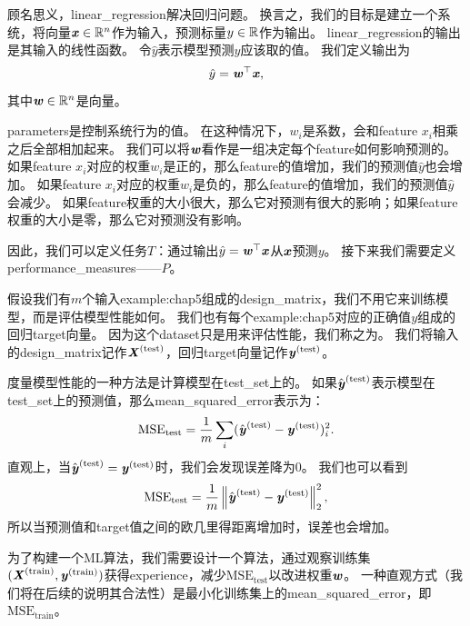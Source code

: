 顾名思义，\gls{linear_regression}解决回归问题。
换言之，我们的目标是建立一个系统，将向量$\boldsymbol{\mathit{x}}\in\mathbb{R}^n$作为输入，预测标量$y\in\mathbb{R}$作为输出。
\gls{linear_regression}的输出是其输入的线性函数。
令$\hat{y}$表示模型预测$y$应该取的值。
我们定义输出为
\begin{equation}
    \hat{y} = \boldsymbol{\mathit{w}}^\top \boldsymbol{\mathit{x}} ,
\end{equation}
其中$\boldsymbol{\mathit{w}}\in\mathbb{R}^n$是向量。

\gls{parameters}是控制系统行为的值。
在这种情况下，$w_i$是系数，会和\gls{feature} $x_i$相乘之后全部相加起来。
我们可以将$\boldsymbol{\mathit{w}}$看作是一组决定每个\gls{feature}如何影响预测的。
如果\gls{feature} $x_i$对应的权重$w_i$是正的，那么\gls{feature}的值增加，我们的预测值$\hat{y}$也会增加。
如果\gls{feature} $x_i$对应的权重$w_i$是负的，那么\gls{feature}的值增加，我们的预测值$\hat{y}$会减少。
如果\gls{feature}权重的大小很大，那么它对预测有很大的影响；如果\gls{feature}权重的大小是零，那么它对预测没有影响。


因此，我们可以定义任务$T$：通过输出$\hat{y} = \boldsymbol{\mathit{w}}^\top \boldsymbol{\mathit{x}}$从$\boldsymbol{\mathit{x}}$预测$y$。
接下来我们需要定义\gls{performance_measures}——$P$。

假设我们有$m$个输入\gls{example:chap5}组成的\gls{design_matrix}，我们不用它来训练模型，而是评估模型性能如何。
我们也有每个\gls{example:chap5}对应的正确值$y$组成的回归\gls{target}向量。
因为这个\gls{dataset}只是用来评估性能，我们称之为。
我们将输入的\gls{design_matrix}记作$\boldsymbol{\mathit{X}}^{\text{(test)}}$，回归\gls{target}向量记作$\boldsymbol{\mathit{y}}^{(\text{test})}$。

度量模型性能的一种方法是计算模型在\gls{test_set}上的。
如果$\hat{\boldsymbol{\mathit{y}}}^{(\text{test})}$表示模型在\gls{test_set}上的预测值，那么\gls{mean_squared_error}表示为：
\begin{equation}
    \text{MSE}_{\text{test}} = \frac{1}{m} \sum_i ( \hat{\boldsymbol{\mathit{y}}}^{(\text{test})} - \boldsymbol{\mathit{y}}^{(\text{test})})_i^2.
\end{equation}
直观上，当$\hat{\boldsymbol{\mathit{y}}}^{(\text{test})} = \boldsymbol{\mathit{y}}^{(\text{test})}$时，我们会发现误差降为$0$。
我们也可以看到
\begin{equation}
    \text{MSE}_{\text{test}} = \frac{1}{m} \left\lVert \hat{\boldsymbol{\mathit{y}}}^{(\text{test})} - \boldsymbol{\mathit{y}}^{(\text{test})}\right\rVert_2^2,
\end{equation}
所以当预测值和\gls{target}值之间的欧几里得距离增加时，误差也会增加。

为了构建一个\gls{ML}算法，我们需要设计一个算法，通过观察训练集$(\boldsymbol{\mathit{X}}^{(\text{train})},\boldsymbol{\mathit{y}}^{(\text{train})})$获得\gls{experience}，减少$\text{MSE}_{\text{test}}$以改进权重$\boldsymbol{\mathit{w}}$。
一种直观方式（我们将在后续的说明其合法性）是最小化训练集上的\gls{mean_squared_error}，即$\text{MSE}_{\text{train}}$。

